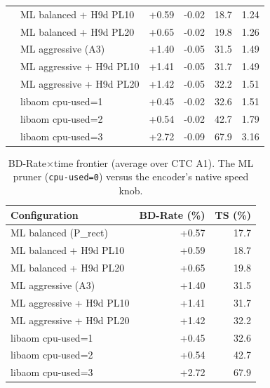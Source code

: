 \begin{table}[t]
\begin{tabular}{llrrrr}
 & ML balanced + H9d PL10 & +0.59 & -0.02 & 18.7 & 1.24 \\
 & ML balanced + H9d PL20 & +0.65 & -0.02 & 19.8 & 1.26 \\
 & ML aggressive (A3) & +1.40 & -0.05 & 31.5 & 1.49 \\
 & ML aggressive + H9d PL10 & +1.41 & -0.05 & 31.7 & 1.49 \\
 & ML aggressive + H9d PL20 & +1.42 & -0.05 & 32.2 & 1.51 \\
 & libaom cpu-used=1 & +0.45 & -0.02 & 32.6 & 1.51 \\
 & libaom cpu-used=2 & +0.54 & -0.02 & 42.7 & 1.79 \\
 & libaom cpu-used=3 & +2.72 & -0.09 & 67.9 & 3.16 \\
\bottomrule
\end{tabular}
\end{table}

\begin{table}[t]
\centering
\caption{BD-Rate$\times$time frontier (average over CTC A1). The ML pruner (\texttt{cpu-used=0}) versus the encoder's native speed knob.}
\label{tab:fase6-frontier}
\begin{tabular}{lrr}
\toprule
Configuration & BD-Rate (\%) & TS (\%) \\
\midrule
ML balanced (P\_rect) & +0.57 & 17.7 \\
ML balanced + H9d PL10 & +0.59 & 18.7 \\
ML balanced + H9d PL20 & +0.65 & 19.8 \\
ML aggressive (A3) & +1.40 & 31.5 \\
ML aggressive + H9d PL10 & +1.41 & 31.7 \\
ML aggressive + H9d PL20 & +1.42 & 32.2 \\
libaom cpu-used=1 & +0.45 & 32.6 \\
libaom cpu-used=2 & +0.54 & 42.7 \\
libaom cpu-used=3 & +2.72 & 67.9 \\
\bottomrule
\end{tabular}
\end{table}
